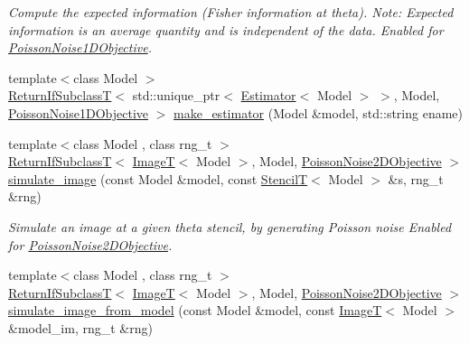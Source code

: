 \begin{DoxyCompactItemize}
\begin{DoxyCompactList}\small\item\em Compute the expected information (Fisher information at theta). Note\+: Expected information is an average quantity and is independent of the data. Enabled for \hyperlink{classmappel_1_1PoissonNoise1DObjective}{Poisson\+Noise1\+D\+Objective}. \end{DoxyCompactList}\item 
{\footnotesize template$<$class Model $>$ }\\\hyperlink{namespacemappel_a3b77d227658ba3ba9e16fea6fa6e626d}{Return\+If\+SubclassT}$<$ std\+::unique\+\_\+ptr$<$ \hyperlink{classmappel_1_1Estimator}{Estimator}$<$ Model $>$ $>$, Model, \hyperlink{classmappel_1_1PoissonNoise1DObjective}{Poisson\+Noise1\+D\+Objective} $>$ \hyperlink{namespacemappel_1_1methods_a0f47a66f366b6e5841f1224e839ed828}{make\+\_\+estimator} (Model \&model, std\+::string ename)
\item 
{\footnotesize template$<$class Model , class rng\+\_\+t $>$ }\\\hyperlink{namespacemappel_a3b77d227658ba3ba9e16fea6fa6e626d}{Return\+If\+SubclassT}$<$ \hyperlink{namespacemappel_a14658186b77757f3c35a69cb1be6cf4b}{ImageT}$<$ Model $>$, Model, \hyperlink{classmappel_1_1PoissonNoise2DObjective}{Poisson\+Noise2\+D\+Objective} $>$ \hyperlink{namespacemappel_1_1methods_a2b9a50b06cafb7ac9d857589df8979dc}{simulate\+\_\+image} (const Model \&model, const \hyperlink{namespacemappel_a3a06598240007876f8c4bf834ad86197}{StencilT}$<$ Model $>$ \&s, rng\+\_\+t \&rng)
\begin{DoxyCompactList}\small\item\em Simulate an image at a given theta stencil, by generating Poisson noise Enabled for \hyperlink{classmappel_1_1PoissonNoise2DObjective}{Poisson\+Noise2\+D\+Objective}. \end{DoxyCompactList}\item 
{\footnotesize template$<$class Model , class rng\+\_\+t $>$ }\\\hyperlink{namespacemappel_a3b77d227658ba3ba9e16fea6fa6e626d}{Return\+If\+SubclassT}$<$ \hyperlink{namespacemappel_a14658186b77757f3c35a69cb1be6cf4b}{ImageT}$<$ Model $>$, Model, \hyperlink{classmappel_1_1PoissonNoise2DObjective}{Poisson\+Noise2\+D\+Objective} $>$ \hyperlink{namespacemappel_1_1methods_a2dd4cb94fa6669d64488ed95bc1c6d02}{simulate\+\_\+image\+\_\+from\+\_\+model} (const Model \&model, const \hyperlink{namespacemappel_a14658186b77757f3c35a69cb1be6cf4b}{ImageT}$<$ Model $>$ \&model\+\_\+im, rng\+\_\+t \&rng)

\end{DoxyCompactItemize}
